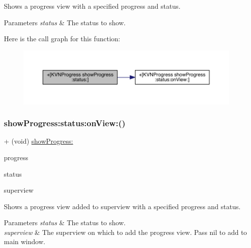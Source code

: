 Shows a progress view with a specified {\ttfamily progress} and {\ttfamily status}. 
\begin{DoxyParams}{Parameters}
{\em status} & The status to show. \\
\hline
\end{DoxyParams}
Here is the call graph for this function\+:\nopagebreak
\begin{figure}[H]
\begin{center}
\leavevmode
\includegraphics[width=350pt]{interface_k_v_n_progress_a2c58c4d42f018ef3efbb163f6390004e_cgraph}
\end{center}
\end{figure}
\mbox{\label{interface_k_v_n_progress_a57a53b4b0ddb93f604d24c50ec9c0602}} 
\subsubsection{\texorpdfstring{show\+Progress\+:status\+:on\+View\+:()}{showProgress:status:onView:()}\hspace{0.1cm}{\footnotesize\ttfamily [1/3]}}
{\footnotesize\ttfamily + (void) \mbox{\hyperlink{interface_k_v_n_progress_abc53102e1cb121a8b38c3337ce372517}{show\+Progress\+:}} \begin{DoxyParamCaption}\item[{(C\+G\+Float)}]{progress }\item[{status:(N\+S\+String$\ast$)}]{status }\item[{onView:(U\+I\+View $\ast$)}]{superview }\end{DoxyParamCaption}}

Shows a progress view added to {\ttfamily superview} with a specified {\ttfamily progress} and {\ttfamily status}. 
\begin{DoxyParams}{Parameters}
{\em status} & The status to show. \\
\hline
{\em superview} & The superview on which to add the progress view. Pass {\ttfamily nil} to add to main window. \\
\hline
\end{DoxyParams}
\mbox{\label{interface_k_v_n_progress_a57a53b4b0ddb93f604d24c50ec9c0602}} 

